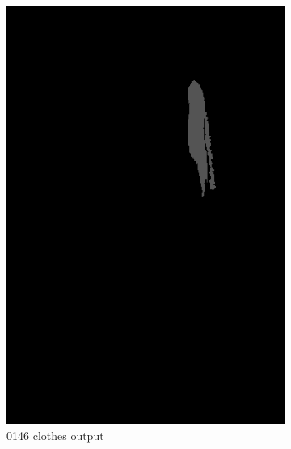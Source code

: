 \documentclass{csc_assignment5}
\begin{document}
\begin{description}
\begin{figure}[h!]
    \centering
    \begin{subfigure}[b]{0.3\textwidth}
        \includegraphics[width=\textwidth]{results-seg/0146_clothes.png}
        \caption{0146 clothes output}
    \end{subfigure}
    \quad
    \begin{subfigure}[b]{0.3\textwidth}

\end{subfigure}
\end{figure}
\end{description}
\end{document}
